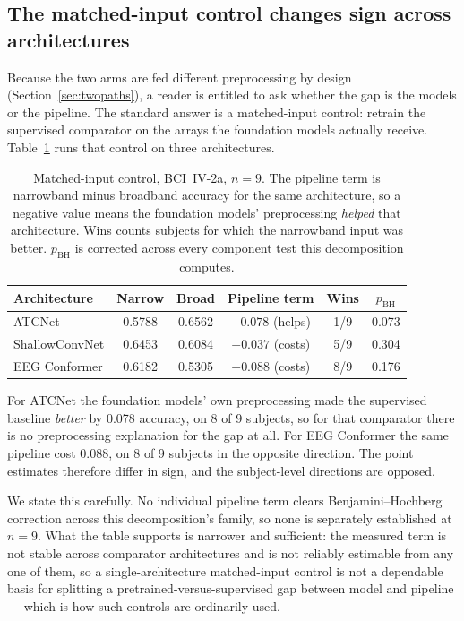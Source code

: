 \subsection{The matched-input control changes sign across architectures}
\label{sec:decomp}

Because the two arms are fed different preprocessing by design
(Section~\ref{sec:twopaths}), a reader is entitled to ask whether the gap is
the models or the pipeline. The standard answer is a matched-input control:
retrain the supervised comparator on the arrays the foundation models actually
receive. Table~\ref{tab:decomp} runs that control on three architectures.

\begin{table}[t]
\centering
\caption{Matched-input control, BCI~IV-2a, $n=9$. The pipeline term is
narrowband minus broadband accuracy for the same architecture, so a negative
value means the foundation models' preprocessing \emph{helped} that
architecture. Wins counts subjects for which the narrowband input was better.
$p_{\mathrm{BH}}$ is corrected across every component test this decomposition
computes.}
\label{tab:decomp}
\small
\begin{tabular}{lccccc}
\toprule
Architecture & Narrow & Broad & Pipeline term & Wins & $p_{\mathrm{BH}}$ \\
\midrule
ATCNet         & 0.5788 & 0.6562 & $-0.078$ (helps) & 1/9 & 0.073 \\
ShallowConvNet & 0.6453 & 0.6084 & $+0.037$ (costs) & 5/9 & 0.304 \\
EEG Conformer  & 0.6182 & 0.5305 & $+0.088$ (costs) & 8/9 & 0.176 \\
\bottomrule
\end{tabular}
\end{table}

For ATCNet the foundation models' own preprocessing made the supervised
baseline \emph{better} by 0.078 accuracy, on 8 of 9 subjects, so for that
comparator there is no preprocessing explanation for the gap at all. For EEG
Conformer the same pipeline cost 0.088, on 8 of 9 subjects in the opposite
direction. The point estimates therefore differ in sign, and the subject-level
directions are opposed.

We state this carefully. No individual pipeline term clears
Benjamini--Hochberg correction across this decomposition's family, so none is
separately established at $n=9$. What the table supports is narrower and
sufficient: the measured term is not stable across comparator architectures and
is not reliably estimable from any one of them, so a single-architecture
matched-input control is not a dependable basis for splitting a
pretrained-versus-supervised gap between model and pipeline --- which is how
such controls are ordinarily used.

